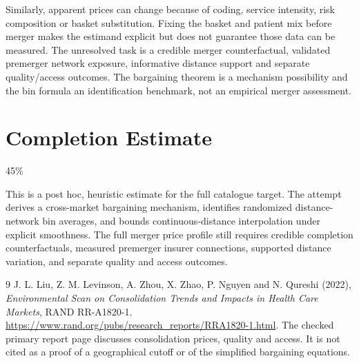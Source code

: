 \documentclass[11pt,a4paper]{article}
\begin{document}
Similarly, apparent prices can change because of coding, service intensity, risk composition or basket substitution. Fixing the basket and patient mix before merger makes the estimand explicit but does not guarantee those data can be measured. The unresolved task is a credible merger counterfactual, validated premerger network exposure, informative distance support and separate quality/access outcomes. The bargaining theorem is a mechanism possibility and the bin formula an identification benchmark, not an empirical merger assessment.

\section{Completion Estimate}
45\%

This is a post hoc, heuristic estimate for the full catalogue target.
The attempt derives a cross-market bargaining mechanism, identifies randomized distance-network bin averages, and bounds continuous-distance interpolation under explicit smoothness. The full merger price profile still requires credible completion counterfactuals, measured premerger insurer connections, supported distance variation, and separate quality and access outcomes.

\begin{thebibliography}{9}
 J. L. Liu, Z. M. Levinson, A. Zhou, X. Zhao, P. Nguyen and N. Qureshi (2022), \emph{Environmental Scan on Consolidation Trends and Impacts in Health Care Markets}, RAND RR-A1820-1. \url{https://www.rand.org/pubs/research_reports/RRA1820-1.html}. The checked primary report page discusses consolidation prices, quality and access. It is not cited as a proof of a geographical cutoff or of the simplified bargaining equations.
\end{thebibliography}
\end{document}
